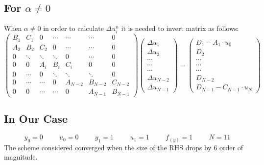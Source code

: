 \documentclass[11pt, a4paper]{article}
\begin{document}
\subsection{For $\alpha \neq 0$}
When $\alpha \neq 0$ in order to calculate $\Delta u^n_i$ it is needed to invert matrix as follows:
\begin{equation}
    \begin{pmatrix}
        B_1 & C_1 & 0 & \cdots & \cdots & \cdots & 0 \\
        A_2 & B_2 & C_2 & 0 & \cdots & \cdots & 0 \\
        0 & \ddots & \ddots & \ddots & 0 & \cdots & 0 \\
        0 & 0 & A_i & B_i & C_i & 0 & 0 \\
        0 & \cdots & 0 & \ddots & \ddots & \ddots & 0 \\
        0 & \cdots & \cdots & 0 & A_{N-2} & B_{N-2} & C_{N-2} \\
        0 & 0 & \cdots & \cdots & 0 & A_{N-1} &B_{N-1}
    \end{pmatrix}
    \begin{pmatrix}
        \Delta u_1\\
        \Delta u_2\\
        \cdots\\
        \cdots\\
        \cdots\\
        \Delta u_{N-2}\\
        \Delta u_{N-1}
    \end{pmatrix}
    =
    \begin{pmatrix}
        D_1-A_1\cdot u_0\\
        D_2\\
        \cdots\\
        \cdots\\
        \cdots\\
        D_{N-2}\\
        D_{N-1}-C_{N-1}\cdot u_N
    \end{pmatrix}
\end{equation}
\subsection{In Our Case}
\begin{equation}
    y_0 = 0 \hspace{1cm}
    u_0 = 0 \hspace{1cm}
    y_1 = 1 \hspace{1cm}
    u_1 = 1 \hspace{1cm}
    f_{(y)} = 1 \hspace{1cm}
    N = 11
\end{equation}
The scheme considered converged when the size of the RHS drops by 6 order of magnitude.
\newpage
\end{document}
